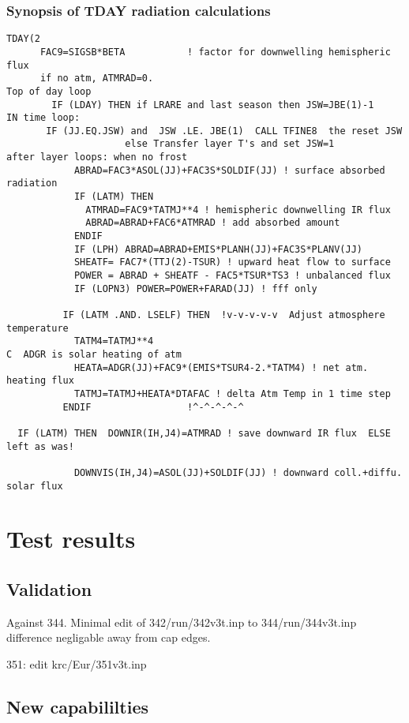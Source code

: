 \documentclass{article}
\begin{document}
\subsubsection{Synopsis of TDAY radiation calculations}
\begin{verbatim}
TDAY(2
      FAC9=SIGSB*BETA           ! factor for downwelling hemispheric flux
      if no atm, ATMRAD=0.
Top of day loop
        IF (LDAY) THEN if LRARE and last season then JSW=JBE(1)-1 
IN time loop:
       IF (JJ.EQ.JSW) and  JSW .LE. JBE(1)  CALL TFINE8  the reset JSW
                     else Transfer layer T's and set JSW=1 
after layer loops: when no frost
            ABRAD=FAC3*ASOL(JJ)+FAC3S*SOLDIF(JJ) ! surface absorbed radiation
            IF (LATM) THEN 
              ATMRAD=FAC9*TATMJ**4 ! hemispheric downwelling IR flux
              ABRAD=ABRAD+FAC6*ATMRAD ! add absorbed amount
            ENDIF 
            IF (LPH) ABRAD=ABRAD+EMIS*PLANH(JJ)+FAC3S*PLANV(JJ)
            SHEATF= FAC7*(TTJ(2)-TSUR) ! upward heat flow to surface
            POWER = ABRAD + SHEATF - FAC5*TSUR*TS3 ! unbalanced flux
            IF (LOPN3) POWER=POWER+FARAD(JJ) ! fff only

          IF (LATM .AND. LSELF) THEN  !v-v-v-v-v  Adjust atmosphere temperature
            TATM4=TATMJ**4
C  ADGR is solar heating of atm
            HEATA=ADGR(JJ)+FAC9*(EMIS*TSUR4-2.*TATM4) ! net atm. heating flux
            TATMJ=TATMJ+HEATA*DTAFAC ! delta Atm Temp in 1 time step
          ENDIF                 !^-^-^-^-^

  IF (LATM) THEN  DOWNIR(IH,J4)=ATMRAD ! save downward IR flux  ELSE left as was!

            DOWNVIS(IH,J4)=ASOL(JJ)+SOLDIF(JJ) ! downward coll.+diffu. solar flux
\end{verbatim}

\section{Test results}
\subsection {Validation}
 Against 344.  Minimal edit of 342/run/342v3t.inp to 344/run/344v3t.inp
\qi difference negligable away from cap edges.
 

351: edit krc/Eur/351v3t.inp

\subsection {New capabililties}
\end{document}

